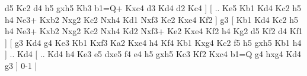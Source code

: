 d5  Kc2 d4  h5 gxh5  Kb3 b1=Q+  Kxc4 d3  Kd4 d2  Kc4   ]  [ .. Ke5  Kb1 Kd4  Kc2 h5  h4 Ne3+  Kxb2 Nxg2  Kc2 Nxh4  Kd1 Nxf3  Ke2 Kxe4  Kf2   ]  g3 [  Kb1 Kd4  Kc2 h5  h4 Ne3+  Kxb2 Nxg2  Kc2 Nxh4  Kd2 Nxf3+  Ke2 Kxe4  Kf2 h4  Kg2 d5  Kf2 d4  Kf1   ]  [  g3 Kd4  g4 Ke3  Kb1 Kxf3  Ka2 Kxe4  h4 Kf4  Kb1 Kxg4  Kc2 f5  h5 gxh5  Kb1 h4   ] .. Kd4    [ .. Kd4  h4 Ke3  e5 dxe5  f4 e4  h5 gxh5  Kc3 Kf2  Kxc4 b1=Q  g4 hxg4  Kd4 g3   ] 0-1  |
